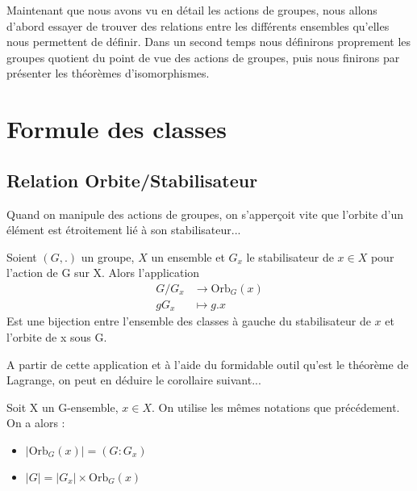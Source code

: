 
\minitoc  %

Maintenant que nous avons vu en détail les actions de groupes, nous allons d'abord essayer de trouver des relations entre les différents ensembles qu'elles 
nous permettent de définir. 
Dans un second temps nous définirons proprement les groupes quotient du point de vue des actions de groupes, puis 
nous finirons par présenter les théorèmes d'isomorphismes. 


\section{Formule des classes}
\subsection{Relation Orbite/Stabilisateur}

Quand on manipule des actions de groupes, on s'apperçoit vite que l'orbite d'un élément 
est étroitement lié à son stabilisateur... 

\begin{proposition}
	Soient $(G,.)$ un groupe, $X$ un ensemble et $G_x$ le stabilisateur de $x \in X$ pour l'action de G sur X. 
	Alors l'application 
		\begin{align*}
			G/G_x &\longrightarrow \text{Orb}_G(x) \\
			g G_x &\longmapsto g.x 
		\end{align*}
	Est une bijection entre l'ensemble des classes à gauche du stabilisateur de $x$ et l'orbite de x sous G. 
\end{proposition}

A partir de cette application et à l'aide du formidable outil qu'est le théorème de Lagrange, on peut en déduire le corollaire suivant... 

\newpage

\begin{corollary}
	Soit X un  G-ensemble, $x \in X$. On utilise les mêmes notations que précédement. On a alors :
	\begin{itemize}
		\item $ | \text{Orb}_G(x) | = (G : G_x) $
		\item $ |G| = |G_x| \times \text{Orb}_G(x) $ 
	\end{itemize}
\end{corollary}

